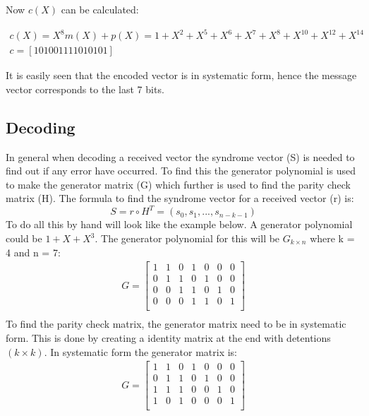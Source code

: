 \documentclass[Main]{subfiles}
\begin{document}
\noindent Now $c(X)$ can be calculated:

\begin{align}
c(X) = X^8m(X)+p(X) = 1 + X^2 + X^5 + X^6 + X^7 + X^8 + X^{10}+ X^{12} + X^{14} \\
c = [1 0 1 0 0 1 1 1 1 0 1 0 1 0 1]
\end{align}

\noindent It is easily seen that the encoded vector is in systematic form, hence the message vector corresponds to the last 7 bits.

\subsection{Decoding}
In general when decoding a received vector the syndrome vector (S) is needed to find out if any error have occurred.
To find this the generator polynomial is used to make the generator matrix (G) which further is used to find the parity check matrix (H).
The formula to find the syndrome vector for a received vector (r) is:
\begin{equation}
S = r \circ H^T = (s_{0},s_{1}, ..., s_{n-k-1})
\end{equation}
To do all this by hand will look like the example below.
A generator polynomial could be $1+X+X^3$. 
The generator polynomial for this will be $G_{k \times n}$ where k = 4 and n = 7:
\begin{align*}
G =
\begin{bmatrix}
1 & 1 & 0 & 1 & 0 & 0 & 0\\
0 & 1 & 1 & 0 & 1 & 0 & 0\\
0 & 0 & 1 & 1 & 0 & 1 & 0\\
0 & 0 & 0 & 1 & 1 & 0 & 1\\
\end{bmatrix} \\
\end{align*}
To find the parity check matrix, the generator matrix need to be in systematic form.
This is done by creating a identity matrix at the end with detentions $(k \times k)$.
In systematic form the generator matrix is:
\begin{align*}
G =
\begin{bmatrix}
1 & 1 & 0 & 1 & 0 & 0 & 0\\
0 & 1 & 1 & 0 & 1 & 0 & 0\\
1 & 1 & 1 & 0 & 0 & 1 & 0\\
1 & 0 & 1 & 0 & 0 & 0 & 1\\
\end{bmatrix} \\
\end{align*}
\end{document}
